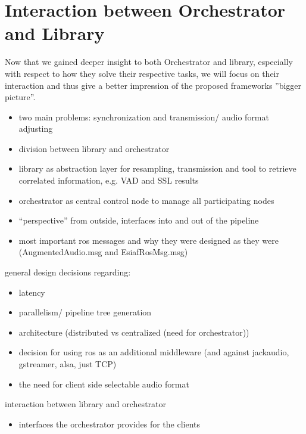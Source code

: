 


\section{Interaction between Orchestrator and Library}

Now that we gained deeper insight to both Orchestrator and library, especially with respect to how they solve their respective tasks, we will focus on their interaction and thus give a better impression of the proposed frameworks ''bigger picture''.




\begin{itemize}
	\item two main problems: synchronization and transmission/ audio format adjusting
	\item division between library and orchestrator
	\item library as abstraction layer for resampling, transmission and tool to retrieve correlated information, e.g. VAD and SSL results
	\item orchestrator as central control node to manage all participating nodes
	\item ``perspective'' from outside, interfaces into and out of the pipeline
	\item most important ros messages and why they were designed as they were (AugmentedAudio.msg and EsiafRosMsg.msg)
\end{itemize}

general design decisions regarding:

\begin{itemize}
	\item latency
	\item parallelism/ pipeline tree generation
	\item architecture (distributed vs centralized (need for orchestrator))
	\item decision for using ros as an additional middleware (and against jackaudio, gstreamer, alsa, just TCP)
	\item the need for client side selectable audio format 
\end{itemize}

interaction between library and orchestrator

\begin{itemize}
	\item interfaces the orchestrator provides for the clients
\end{itemize}


